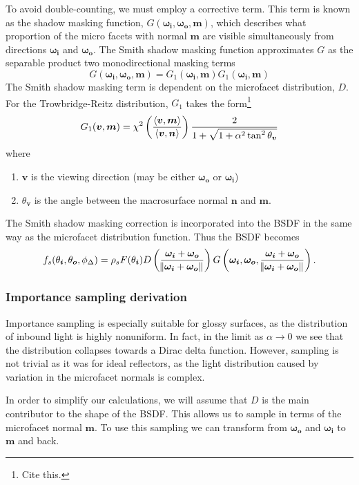 \documentclass[12pt]{article}
\DeclarePairedDelimiter\ip{\langle }{\rangle}
\begin{document}
To avoid double-counting, we must employ a corrective term.
This term is known as the shadow masking function, \(G(\bm{\omega_i}, \bm{\omega_o}, \bm m)\), which describes what proportion of the micro facets with normal \(\bm m\) are visible simultaneously from directions \(\bm{\omega_i}\) and \(\bm{\omega_o}\).
The Smith shadow masking function approximates \(G\) as the separable product two monodirectional masking terms
\[G(\bm{\omega_i}, \bm{\omega_o}, \bm m) = G_1(\bm{\omega_i}, \bm m)G_1(\bm{\omega_i}, \bm m)\]
The Smith shadow masking term is dependent on the microfacet distribution, \(D\).
For the Trowbridge-Reitz distribution, \(G_1\) takes the form\footnote{Cite this.}
\[G_1(\bm v, \bm m) = \chi^2\del{\frac{\ip{\bm v, \bm m}}{\ip{\bm v, \bm n}}} \frac{2}{1 + \sqrt{1 + \alpha^2 \tan^2{\theta_{\bm v}}}}\]
where
\begin{enumerate}
\item \(\bm v\) is the viewing direction (may be either \(\bm{\omega_o}\) or \(\bm{\omega_i}\))
\item \(\theta_{\bm v}\) is the angle between the macrosurface normal \(\bm n\) and \(\bm m\).
\end{enumerate}
The Smith shadow masking correction is incorporated into the BSDF in the same way as the microfacet distribution function.
Thus the BSDF becomes
\[f_s(\theta_{\bm i}, \theta_{\bm o}, \phi_\Delta) = \rho_sF(\theta_{\bm i})D\del{\frac{\bm{\omega_i} + \bm{\omega_o}}{\norm{\bm{\omega_i} + \bm{\omega_o}}}}G\del{\bm{\omega_i}, \bm{\omega_o}, \frac{\bm{\omega_i} + \bm{\omega_o}}{\norm{\bm{\omega_i} + \bm{\omega_o}}}}.\]

\subsubsection{Importance sampling derivation}

Importance sampling is especially suitable for glossy surfaces, as the distribution of inbound light is highly nonuniform.
In fact, in the limit as \(\alpha \to 0\) we see that the distribution collapses towards a Dirac delta function.
However, sampling is not trivial as it was for ideal reflectors, as the light distribution caused by variation in the microfacet normals is complex.

In order to simplify our calculations, we will assume that \(D\) is the main contributor to the shape of the BSDF.
This allows us to sample in terms of the microfacet normal \(\bm m\).
To use this sampling we can transform from \(\bm{\omega_o}\) and \(\bm{\omega_i}\) to \(\bm m\) and back.
\end{document}
